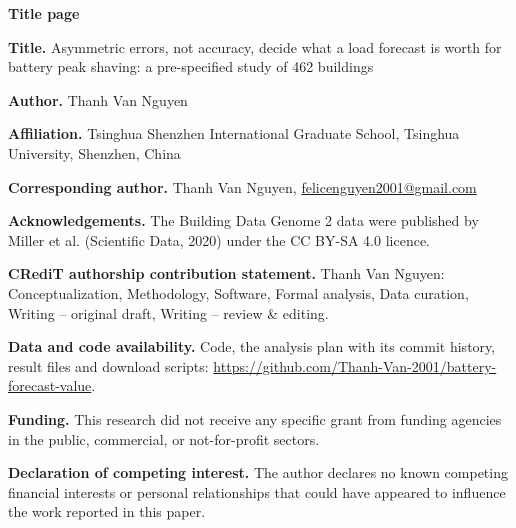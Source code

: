 \documentclass[12pt]{article}
\begin{document}
\textbf{\large Title page}

\textbf{Title.} Asymmetric errors, not accuracy, decide what a load forecast is worth for battery peak shaving: a pre-specified study of 462 buildings

\textbf{Author.} Thanh Van Nguyen

\textbf{Affiliation.} Tsinghua Shenzhen International Graduate School, Tsinghua University, Shenzhen, China

\textbf{Corresponding author.} Thanh Van Nguyen, \href{mailto:felicenguyen2001@gmail.com}{felicenguyen2001@gmail.com}

\textbf{Acknowledgements.} The Building Data Genome 2 data were published by Miller et al. (Scientific Data, 2020) under the CC BY-SA 4.0 licence.

\textbf{CRediT authorship contribution statement.} Thanh Van Nguyen: Conceptualization, Methodology, Software, Formal analysis, Data curation, Writing -- original draft, Writing -- review \& editing.

\textbf{Data and code availability.} Code, the analysis plan with its commit history, result files and download scripts: \url{https://github.com/Thanh-Van-2001/battery-forecast-value}.

\textbf{Funding.} This research did not receive any specific grant from funding agencies in the public, commercial, or not-for-profit sectors.

\textbf{Declaration of competing interest.} The author declares no known competing financial interests or personal relationships that could have appeared to influence the work reported in this paper.
\end{document}

